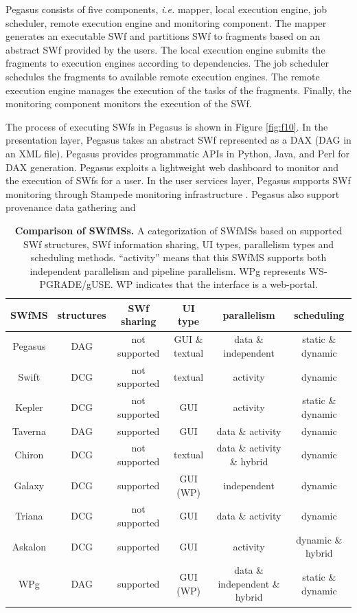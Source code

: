 Pegasus consists of five components, \textit{i.e.} mapper, local execution engine, job scheduler, remote execution engine and monitoring component. 
The mapper generates an executable SWf and partitions SWf to fragments based on an abstract SWf provided by the users.
The local execution engine submits the fragments to execution engines according to dependencies.
The job scheduler schedules the fragments to available remote execution engines.
The remote execution engine manages the execution of the tasks of the fragments. 
Finally, the monitoring component monitors the execution of the SWf.

The process of executing SWfs in Pegasus is shown in
Figure \ref{fig:f10}. In the presentation layer, Pegasus takes an 
abstract SWf represented as a DAX (DAG in an XML file).
Pegasus provides programmatic APIs in Python, Java, and Perl for DAX generation\cite{PegasusUserGuide}. Pegasus exploits a lightweight web dashboard to monitor and the execution of SWfs for a user.
In the user services layer, Pegasus supports SWf monitoring through Stampede monitoring infrastructure \cite{Gunter2011,Samak2011}. 
Pegasus also support provenance data gathering and
\begin{landscape}
\begin{table}
\caption{\textbf{Comparison of SWfMSs. }A categorization of SWfMSs based
on supported SWf structures, SWf information sharing, UI types, 
parallelism types and scheduling methods. \textquotedblleft{}activity\textquotedblright{} 
means that this SWfMS supports both independent parallelism and pipeline parallelism. WPg represents WS-PGRADE/gUSE. WP indicates that the interface is a web-portal.}
\label{tab:sim}
\begin{centering}
\captionsetup{justification=centering}
\begin{tabular}{cccccc}
\hline 
SWfMS & structures & SWf sharing & UI type & parallelism & scheduling \tabularnewline
\hline 
Pegasus & DAG & not supported & GUI \& textual & data \& independent & static \& dynamic \tabularnewline
Swift & DCG & not supported & textual & activity & dynamic \tabularnewline
Kepler & DCG & not supported & GUI & activity & static \& dynamic \tabularnewline
Taverna & DAG & supported & GUI & data \& activity & dynamic \tabularnewline
Chiron & DCG & not supported & textual & data \& activity \& hybrid & dynamic \tabularnewline
Galaxy & DCG & supported & GUI (WP) & independent & dynamic \tabularnewline
Triana & DCG & not supported & GUI & data \& activity & dynamic \tabularnewline
Askalon & DCG & supported & GUI  & activity & dynamic \& hybrid \tabularnewline
WPg & DAG & supported & GUI (WP) & data \& independent \& hybrid & static \& dynamic \tabularnewline
\hline 
\end{tabular}
\par\end{centering} 
\end{table}
\end{landscape}
